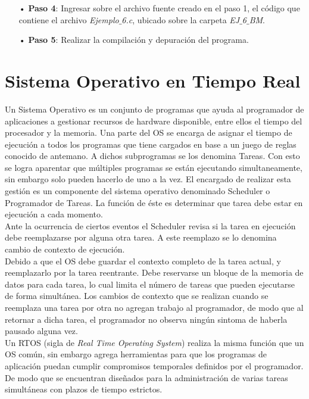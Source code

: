 \documentclass[12pt,letterpaper]{article}
\begin{document}
\begin{enumerate}
\item[•]\textbf{Paso 4}: Ingresar sobre el archivo fuente creado en el paso 1, el código que contiene el archivo \textit{Ejemplo$\_$6.c}, ubicado sobre la carpeta \textit{EJ$\_$6$\_$BM}.
\item[•]\textbf{Paso 5}: Realizar la compilación y depuración del programa.
\end{enumerate}




\section{Sistema Operativo en Tiempo Real}
Un Sistema Operativo es un conjunto de programas que ayuda al programador de aplicaciones a gestionar recursos de hardware disponible, entre ellos el tiempo del procesador y la memoria.
Una parte del OS se encarga de asignar el tiempo de ejecución a todos los programas que tiene cargados en base a un juego de reglas conocido de antemano. A dichos subprogramas se los denomina Tareas.
Con esto se logra aparentar que múltiples programas se están ejecutando simultaneamente, sin embargo solo pueden hacerlo de uno a la vez.
El encargado de realizar esta gestión es un componente del sistema operativo denominado Scheduler o Programador de Tareas. La función de éste es determinar que tarea debe estar en ejecución a cada momento.
 \\
 
Ante la ocurrencia de ciertos eventos el Scheduler revisa si la tarea en ejecución debe reemplazarse por alguna otra tarea. A este reemplazo se lo denomina cambio de contexto de ejecución.
 \\
 
Debido a que el OS debe guardar el contexto completo de la tarea actual, y reemplazarlo por la tarea reentrante. Debe reservarse un bloque de la memoria de datos para cada tarea, lo cual limita el número de tareas que pueden ejecutarse de forma simultánea. Los cambios de contexto que se realizan cuando se reemplaza una tarea por otra no agregan trabajo al programador, de modo que al retornar a dicha tarea, el programador no observa ningún sintoma de haberla pausado alguna vez.
 \\
 
Un RTOS (sigla de \textit{Real Time Operating System}) realiza la misma función que un OS común, sin embargo agrega herramientas para que los programas de aplicación puedan cumplir compromisos temporales definidos por el programador. De modo que se encuentran diseñados para la administración de varias tareas simultáneas con plazos de tiempo estrictos.
 \\
 
\end{document}
